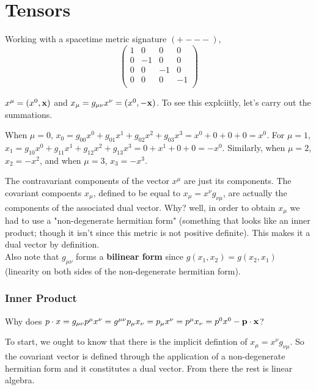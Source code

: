 \chapter{Tensors} \label{chapter:tensors}

Working with a spacetime metric signature $(+ - - -)$,
$$
\begin{pmatrix}
    1 & 0  & 0  & 0  \\
    0 & -1 & 0  & 0  \\
    0 & 0  & -1 & 0  \\
    0 & 0  & 0  & -1 \\
\end{pmatrix}
$$

$x^\mu = (x^0, \boldsymbol{\mathbf{x}})$ and $x_\mu = g_{\mu\nu} x^\nu = (x^0, -\boldsymbol{\mathbf{x}})$.
To see this explciitly, let's carry out the summations.

When $\mu = 0$, $x_0 = g_{00}x^0 + g_{01}x^1 + g_{02}x^2 + g_{03}x^3 = x^0 + 0 + 0 +0 = x^0$.
For $\mu = 1$, $x_1 = g_{10}x^0 + g_{11}x^1 + g_{12}x^2 + g_{13}x^3 = 0 + x^1 + 0 +0 = -x^0$.
Similarly, when $\mu = 2$, $x_2 = -x^2$, and when $\mu =3$, $x_3 = -x^3$.

The contravariant components of the vector $x^\mu$ are just its components.
The covariant compoents $x_\mu$, defined to be equal to $x_\mu = x^\nu g_{\nu\mu}$, are actually the components
of the associated dual vector.
Why? well, in order to obtain $x_\mu$ we had to use a "non-degenerate hermitian form"
(something that looks like an inner product; though it isn't since this metric is not positive definite).
This makes it a dual vector by definition.
\\

Also note that $g_{\mu\nu}$ forms a \textbf{bilinear form} since $g(x_1, x_2) = g(x_2, x_1)$
(linearity on both sides of the non-degenerate hermitian form).


\subsection{Inner Product}

Why does $p \cdot x = g_{\mu\nu} p^\mu x^\nu = g^{\mu\nu} p_\mu x_\nu = p_\mu x^\nu = p^\mu x_\nu = p^0 x^0 - \boldsymbol{\mathbf{p}}\cdot\boldsymbol{\mathbf{x}}$?

To start, we ought to know that there is the implicit defintion of
$x_\mu = x^\nu g_{\nu\mu}$.
So the covariant vector is defined through the application of a non-degenerate hermitian form
and it constitutes a dual vector.
From there the rest is linear algebra.


